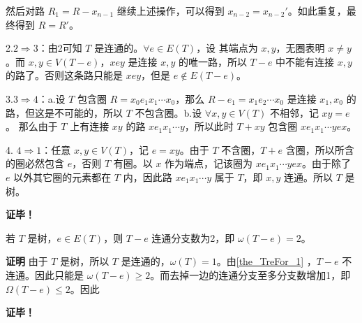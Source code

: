 然后对路 $R_1=R-x_{n-1}$ 继续上述操作，可以得到 $x_{n-2}=x_{n-2}'$。如此重复，最终得到 $R=R'$。

2.$2\Rightarrow 3$：由2可知 $T$ 是连通的。$\forall e\in E(T)$，设 其端点为 $x,y$，无圈表明 $x\neq y$。而 $x,y\in V(T-e)$，$xey$ 是连接 $x,y$ 的唯一路，所以 $T-e$ 中不能有连接 $x,y$ 的路了。否则这条路只能是 $xey$，但是 $e\not\in E(T-e)$。

3.$3\Rightarrow 4$：a.设 $T$ 包含圈 $R=x_0e_1x_1\cdots x_0$，那么 $R-e_1=x_1e_2\cdots x_0$ 是连接 $x_1,x_0$ 的路，但这是不可能的，所以 $T$ 不包含圈。b.设 $\forall x,y\in V(T)$ 不相邻，记 $xy=e$。 那么由于 $T$ 上有连接 $xy$ 的路 $xe_1x_1\cdots y$，所以此时 $T+xy$ 包含圈 $xe_1x_1\cdots yex$。 

4. $4\Rightarrow 1$：任意 $x,y\in V(T)$，记 $e=xy$。由于 $T$ 不含圈，$T+e$ 含圈，所以所含的圈必然包含 $e$，否则 $T$ 有圈。以 $x$ 作为端点，记该圈为 $xe_1x_1\cdots yex$。由于除了 $e$ 以外其它圈的元素都在 $T$ 内，因此路 $x e_1x_1\cdots y$ 属于 $T$，即 $x,y$ 连通。所以 $T$ 是树。 

\textbf{证毕！}


\begin{corollary}{}
若 $T$ 是树，$e\in E(T)$，则 $T-e$ 连通分支数为2，即 $\omega(T-e)=2$。
\end{corollary}
\textbf{证明}
由于 $T$ 是树，所以 $T$ 是连通的，$\omega(T)=1$。由\autoref{the_TreFor_1} ，$T-e$ 不连通。因此只能是 $\omega(T-e)\geq 2$。而去掉一边的连通分支至多分支数增加1，即 $\Omega(T-e)\leq 2$。因此 $$

\textbf{证毕！}





















